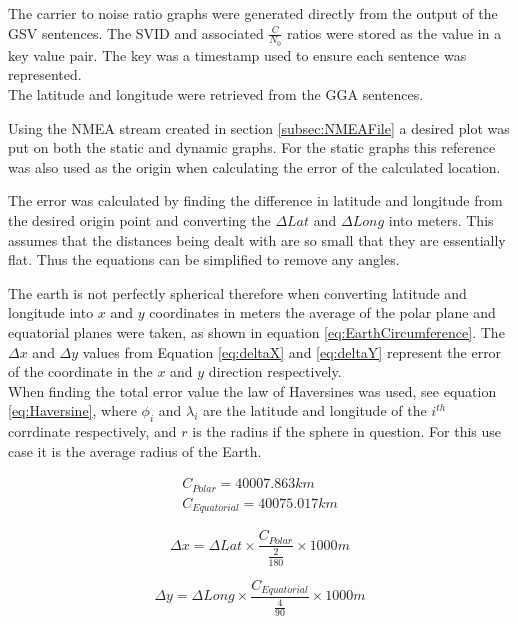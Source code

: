 The carrier to noise ratio graphs were generated directly from the output of the GSV sentences. The SVID and associated $\frac{C}{N_0}$ ratios were stored as the value in
a key value pair. The key was a timestamp used to ensure each sentence was represented.\\
The latitude and longitude were retrieved from the GGA sentences.

Using the NMEA stream created in section \ref{subsec:NMEAFile} a desired plot was put on both the static and dynamic graphs. For the static graphs this reference was also
used as the origin when calculating the error of the calculated location.

The error was calculated by finding the difference in latitude and longitude from the desired origin point and converting the $\Delta Lat$ and $\Delta Long$ into meters.
This assumes that the distances being dealt with are so small that they are essentially flat. Thus the equations can be simplified to remove any angles.

The earth is not perfectly spherical therefore when converting latitude and longitude into $x$ and $y$ coordinates in meters the average of the polar plane and equatorial
planes were taken, as shown in equation \ref{eq:EarthCircumference}. The $\Delta x$ and $\Delta y$ values from Equation \ref{eq:deltaX} and \ref{eq:deltaY} represent
the error of the coordinate in the $x$ and $y$ direction respectively. \\
When finding the total error value the law of Haversines was used, see equation \ref{eq:Haversine}, where $\phi_i$ and $\lambda_i$ are the latitude and longitude of the
$i^{th}$ corrdinate respectively, and $r$ is the radius if the sphere in question. For this use case it is the average radius of the Earth.  

\begin{equation} 
    \begin{split} \label{eq:EarthCircumference}
        C_{Polar} = 40007.863 km \\ 
        C_{Equatorial} = 40075.017 km
    \end{split}
\end{equation}

\begin{equation} \label{eq:deltaX}
    \Delta x = \Delta Lat \times \frac{C_{Polar}}{\frac{2}{180}} \times 1000 m
\end{equation}

\begin{equation} \label{eq:deltaY}
    \Delta y = \Delta Long \times \frac{C_{Equatorial}}{\frac{4}{90}} \times 1000 m
\end{equation}

